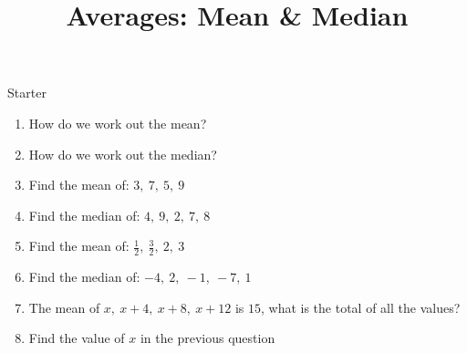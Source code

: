 \documentclass{beamer}
\title{Averages: Mean \& Median}
\author{}
\date{}
\newcommand{\ashow}[1]{\uncover<2->{\textcolor{red}{\small #1}}}
\newcommand{\ashowq}[1]{\alt<2->{\textcolor{red}{\small #1}}{?}}
\begin{document}
\begin{frame}{Starter}
\vspace{-0.8em}

\footnotesize
\begin{enumerate}\itemsep2pt
  \item How do we work out the mean? \ashow{Add the values and divide by how many there are.}
  \item How do we work out the median? \ashow{Order the data and find the middle value.}
  \item Find the mean of: $3,\ 7,\ 5,\ 9$ \ashow{$=6$}
  \item Find the median of: $4,\ 9,\ 2,\ 7,\ 8$ \ashow{$=7$}
  \item Find the mean of: $\frac{1}{2},\ \frac{3}{2},\ 2,\ 3$ \ashow{$=\frac{7}{4}$}
  \item Find the median of: $-4,\ 2,\ -1,\ -7,\ 1$ \ashow{$=-1$}
  \item The mean of $x,\ x+4,\ x+8,\ x+12$ is $15$, what is the total of all the values? \ashow{$60$}
  \item Find the value of $x$ in the previous question \ashow{$x=9$}
\end{enumerate}

\end{frame}
\end{document}
